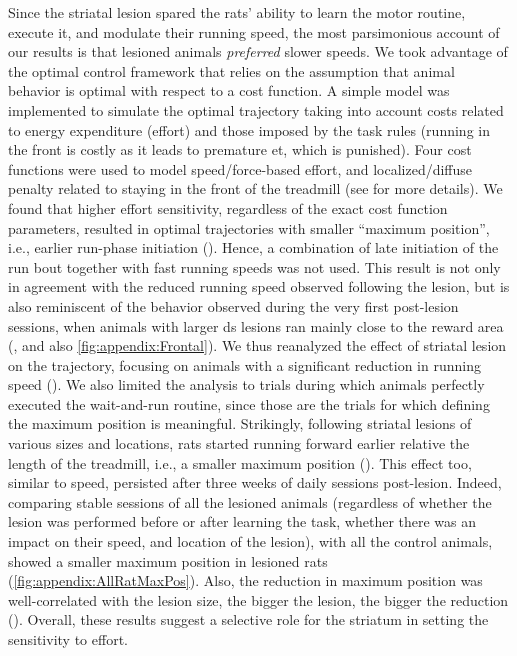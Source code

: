 Since the striatal lesion spared the rats' ability to learn the motor routine, execute it, and modulate their running speed, the most parsimonious account of our results is that lesioned animals \textit{preferred} slower speeds.
We took advantage of the optimal control framework that relies on the assumption that animal behavior is optimal with respect to a cost function.
A simple model was implemented to simulate the optimal trajectory taking into account costs related to energy expenditure (effort) and those imposed by the task rules (running in the front is costly as it leads to premature \gls{et}, which is punished).
Four cost functions were used to model speed/force-based effort, and localized/diffuse penalty related to staying in the front of the treadmill (see \cite{JuradoParras2020} for more details).
We found that higher effort sensitivity, regardless of the exact cost function parameters, resulted in optimal trajectories with smaller ``maximum position'', i.e., earlier run-phase initiation ().
Hence, a combination of late initiation of the run bout together with fast running speeds was not used.
This result is not only in agreement with the reduced running speed observed following the lesion, but is also reminiscent of the behavior observed during the very first post-lesion sessions, when animals with larger \gls{ds} lesions ran mainly close to the reward area (, and also \autoref{fig:appendix:Frontal}).
We thus reanalyzed the effect of striatal lesion on the trajectory, focusing on animals with a significant reduction in running speed ().
We also limited the analysis to trials during which animals perfectly executed the wait-and-run routine, since those are the trials for which defining the maximum position is meaningful.
Strikingly, following striatal lesions of various sizes and locations, rats started running forward earlier relative the length of the treadmill, i.e., a smaller maximum position ().
This effect too, similar to speed, persisted after three weeks of daily sessions post-lesion.
Indeed, comparing stable sessions of all the lesioned animals (regardless of whether the lesion was performed before or after learning the task, whether there was an impact on their speed, and location of the lesion), with all the control animals, showed a smaller maximum position in lesioned rats (\autoref{fig:appendix:AllRatMaxPos}).
Also, the reduction in maximum position was well-correlated with the lesion size, the bigger the lesion, the bigger the reduction ().
Overall, these results suggest a selective role for the striatum in setting the sensitivity to effort.